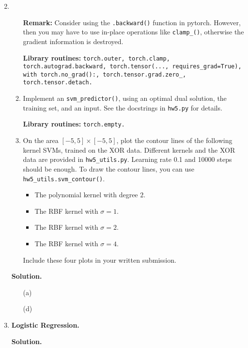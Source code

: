 \documentclass{article}
\theoremstyle{definition}
\theoremstyle{remark}
\newenvironment{Q}
{%
\clearpage
\item
}
{%
\phantom{s}%
\bigskip%
\noindent\textbf{Solution.}
}
\begin{document}
\begin{enumerate}[font={\Large\bfseries},left=0pt]
\begin{Q}
\begin{enumerate}
    \textbf{Remark:} Consider using the \texttt{.backward()} function in pytorch. However, then you may have to use in-place operations like \texttt{clamp\_()}, otherwise the gradient information is destroyed.
    
    \textbf{Library routines:} \texttt{torch.outer, torch.clamp, torch.autograd.backward, torch.tensor(..., requires\_grad=True), with torch.no\_grad():, torch.tensor.grad.zero\_, torch.tensor.detach.}

        \item Implement an \texttt{svm\_predictor()}, using an optimal dual solution, the training set, and an input. See the docstrings in \texttt{hw5.py} for details.
        
        \textbf{Library routines:} \texttt{torch.empty.}

        \item On the area $[-5,5]\times[-5,5]$, plot the contour lines of the following kernel SVMs, trained on the XOR data. Different kernels and the XOR data are provided in \texttt{hw5\_utils.py}. Learning rate 0.1 and 10000 steps should be enough. To draw the contour lines, you can use \texttt{hw5\_utils.svm\_contour()}.
        \begin{itemize}
            \item The polynomial kernel with degree $2$.
            \item The RBF kernel with $\sigma=1$.
            \item The RBF kernel with $\sigma=2$.
            \item The RBF kernel with $\sigma=4$.
        \end{itemize}
        Include these four plots in your written submission.
    \end{enumerate}
\end{Q}
\begin{enumerate}
  \item[(a)]
  \item[(d)]
\end{enumerate}
    
\begin{Q}
  \textbf{\Large Logistic Regression.}


\end{Q}
\end{enumerate}
\end{document}
